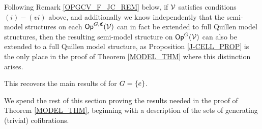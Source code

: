 \documentclass[a4paper,10pt
,draft
]{article}%
\renewcommand{\F}{\mathcal F}
\renewcommand{\1}{\eta}%
\begin{document}

\begin{remark}
      \label{OPGCV_FULL_REM}
      Following Remark \ref{OPGCV_F_JC_REM} below, if $\mathcal V$ satisfies conditions $(i) - (vi)$ above,
      and additionally we know independently that
      the semi-model structures on each $\mathsf{Op}^{G, \mathfrak C}(\mathcal V)$ can in fact be extended to full Quillen model structures,
      then the resulting semi-model structure on $\mathsf{Op}^G(\mathcal V)$ can also be extended to a full Quillen model structure,
      as Proposition \ref{J-CELL_PROP} is the only place in the proof of Theorem \ref{MODEL_THM} where this distinction arises.
\end{remark}

\begin{remark}
      This recovers the main results of \cite{BM13, Cav} for $G = \left\{e\right\}$. 
\end{remark}



We spend the rest of this section proving the results needed in the proof of Theorem \ref{MODEL_THM},
beginning with a description of the sets of generating (trivial) cofibrations.
\end{document}
